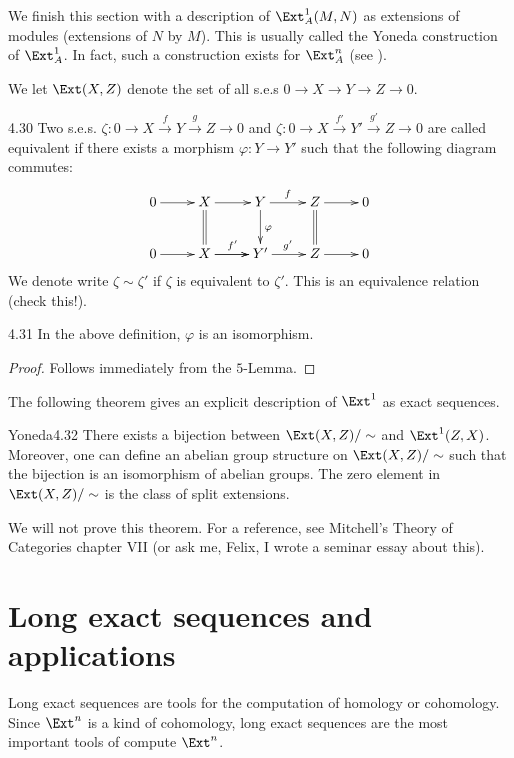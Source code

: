 \documentclass[twoside = false,	%
		headsepline,		%
		parskip = true,
		]{scrbook}						%
\begin{document}
    We finish this section with a description of $\Ext_A^1(M,N)$ as extensions of modules (extensions of $N$ by $M$). This is usually called the Yoneda construction of $\Ext_A^1$. In fact, such a construction exists for $\Ext^n_A$ (see \cite{Weibel.2010}).

    We let $\Ext(X,Z)$ denote the set of all s.e.s $0 \to X \to Y \to Z \to 0$.

    \begin{definition}{}{4.30}
        Two s.e.s. $\zeta: 0 \to X \xrightarrow{f} Y \xrightarrow{g} Z \to 0$ and $\zeta: 0 \to X \xrightarrow{f'} Y' \xrightarrow{g'} Z \to 0$ are called equivalent if there exists a morphism $\varphi: Y \to Y'$ such that the following diagram commutes:
        \begin{equation*}
        \xymatrix {
            0 \ar[r] & X \ar[r] \ar@{=}[d] & Y \ar[r]^f \ar[d]^{\varphi} & Z \ar[r] \ar@{=}[d] & 0 \\
            0 \ar[r] & X \ar[r] \ar[r]^{f'} & Y' \ar[r]^{g'} & Z \ar[r] & 0
        }
        \end{equation*}
        We denote write $\zeta \sim \zeta'$ if $\zeta$ is equivalent to $\zeta'$. This is an equivalence relation (check this!).
    \end{definition}

    \begin{lemma}{}{4.31}
        In the above definition, $\varphi$ is an isomorphism.
    \end{lemma}

    \begin{proof}
        Follows immediately from the $5$-Lemma.
    \end{proof}

    The following theorem gives an explicit description of $\Ext^1$ as exact sequences.

    \begin{theorem}{Yoneda}{4.32}
        There exists a bijection between $\Ext(X,Z)/\sim$ and $\Ext^1(Z,X)$. Moreover, one can define an abelian group structure on $\Ext(X,Z)/\sim$ such that the bijection is an isomorphism of abelian groups. The zero element in $\Ext(X,Z)/\sim$ is the class of split extensions.
    \end{theorem}

    We will not prove this theorem. For a reference, see Mitchell's Theory of Categories \cite{Mitchell.1971} chapter VII (or ask me, Felix, I wrote a seminar essay about this).

\section{Long exact sequences and applications}
    Long exact sequences are tools for the computation of homology or cohomology. Since $\Ext^n$ is a kind of cohomology, long exact sequences are the most important tools of compute $\Ext^n$.
\end{document}
